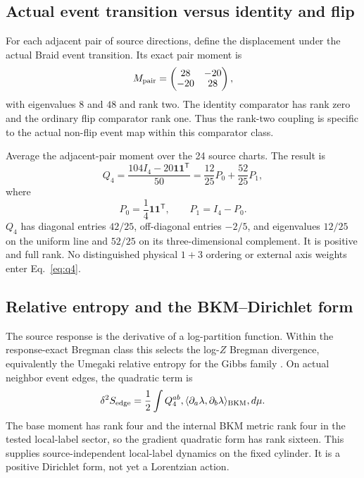 \documentclass[11pt]{article}
\theoremstyle{definition}
\theoremstyle{remark}
\begin{document}
\subsection{Actual event transition versus identity and flip}

For each adjacent pair of source directions, define the displacement under the actual Braid event transition. Its exact pair moment is
\begin{equation}
 M_{\rm pair}=
 \begin{pmatrix}
 28&-20\\[-0.15em]
 -20&28
 \end{pmatrix},
\end{equation}
with eigenvalues $8$ and $48$ and rank two. The identity comparator has rank zero and the ordinary flip comparator rank one. Thus the rank-two coupling is specific to the actual non-flip event map within this comparator class.

Average the adjacent-pair moment over the 24 source charts. The result is
\begin{equation}\label{eq:q4}
 Q_4=\frac{104I_4-20\mathbf1\mathbf1^{\mathsf T}}{50}
 =\frac{12}{25}P_0+\frac{52}{25}P_1,
\end{equation}
where
\begin{equation}
 P_0=\frac14\mathbf1\mathbf1^{\mathsf T},\qquad
 P_1=I_4-P_0.
\end{equation}
$Q_4$ has diagonal entries $42/25$, off-diagonal entries $-2/5$, and eigenvalues $12/25$ on the uniform line and $52/25$ on its three-dimensional complement. It is positive and full rank. No distinguished physical $1+3$ ordering or external axis weights enter Eq.~\eqref{eq:q4}.

\subsection{Relative entropy and the BKM--Dirichlet form}

The source response is the derivative of a log-partition function. Within the response-exact Bregman class this selects the log-$Z$ Bregman divergence, equivalently the Umegaki relative entropy for the Gibbs family \cite{umegaki1962,amari2016}. On actual neighbor event edges, the quadratic term is
\begin{equation}\label{eq:bkm}
 \delta^2 S_{\rm edge}
 =\frac12\int Q_4^{ab},
 \langle \partial_a\lambda,\partial_b\lambda\rangle_{\rm BKM},d\mu.
\end{equation}
The base moment has rank four and the internal BKM metric rank four in the tested local-label sector, so the gradient quadratic form has rank sixteen. This supplies source-independent local-label dynamics on the fixed cylinder. It is a positive Dirichlet form, not yet a Lorentzian action.
\end{document}
